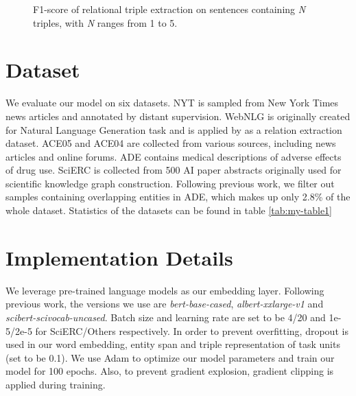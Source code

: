 \documentclass[11pt]{article}
\begin{document}
\begin{figure*}[htbp]
 \vspace{-0.2cm}
  \centering
  \hspace{-0.02\textwidth}
  \vspace{-0.2cm}
  \caption{\label{fig: nums} F1-score of relational triple extraction on sentences containing \textit{N} triples, with \textit{N} ranges from 1 to 5.}
  \vspace{-0.2cm}
\end{figure*}

\section{Dataset}
\label{sec A}
We evaluate our model on six datasets. NYT \citep{riedel2010modeling} is sampled from New York Times news articles and annotated by distant supervision. WebNLG is originally created for Natural Language Generation task and is applied by \citep{zeng-etal-2018-extracting} as a relation extraction dataset. ACE05 and ACE04 \citep{walker2006ace} are collected from various sources, including news articles and online forums. ADE \citep{gurulingappa2012development} contains medical descriptions of adverse effects of drug use. SciERC \citep{luan-etal-2018-multi} is collected from 500 AI paper abstracts originally used for scientific knowledge graph construction. Following previous work, we filter out samples containing overlapping entities in ADE, which makes up only 2.8\% of the whole dataset.
Statistics of the datasets can be found in table \ref{tab:my-table1}


\section{Implementation Details}
\label{sec: Appendix c}
We leverage pre-trained language models as our embedding layer. Following previous work, the versions we use are \emph{bert-base-cased}, \emph{albert-xxlarge-v1} and \emph{scibert-scivocab-uncased}. Batch size and learning rate are set to be 4/20 and 1e-5/2e-5 for SciERC/Others respectively. In order to prevent overfitting, dropout \citep{srivastava2014dropout} is used in our word embedding, entity span and triple representation of task units (set to be 0.1). We use Adam \citep{kingma2014adam} to optimize our model parameters and train our model for 100 epochs. Also, to prevent gradient explosion, gradient clipping
is applied during training.
\end{document}
